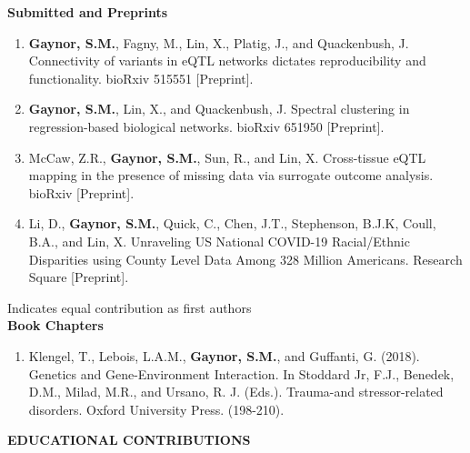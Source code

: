 \documentclass[10pt]{article}
\begin{document}
\indent \textbf{Submitted and Preprints} \\

\begin{enumerate}
\item \textbf{Gaynor, S.M.}, Fagny, M., Lin, X., Platig, J., and Quackenbush, J. Connectivity of variants in eQTL networks dictates reproducibility and functionality. bioRxiv 515551 [Preprint].  
\item \textbf{Gaynor, S.M.}, Lin, X., and Quackenbush, J. Spectral clustering in regression-based biological networks. bioRxiv 651950 [Preprint].
\item McCaw, Z.R., \textbf{Gaynor, S.M.}, Sun, R.,  and Lin, X. Cross-tissue eQTL mapping in the presence of missing data via surrogate outcome analysis. bioRxiv [Preprint].
\item Li, D., \textbf{Gaynor, S.M.}, Quick, C., Chen, J.T., Stephenson, B.J.K, Coull, B.A.,  and Lin, X. Unraveling US National COVID-19 Racial/Ethnic Disparities using County Level Data Among 328 Million Americans. Research Square [Preprint].
\end{enumerate}

\indent \indent  * Indicates equal contribution as first authors\\


\indent \textbf{Book Chapters} \\
\begin{enumerate}
	\item Klengel, T., Lebois, L.A.M., \textbf{Gaynor, S.M.}, and Guffanti, G. (2018). Genetics and Gene-Environment Interaction. In Stoddard Jr, F.J.,
Benedek, D.M., Milad, M.R., and Ursano, R. J. (Eds.). Trauma-and stressor-related disorders. Oxford University Press. (198-210).\\
\end{enumerate}

\vspace{0.cm}

{\bf  EDUCATIONAL CONTRIBUTIONS} \hrulefill \\
\end{document}
